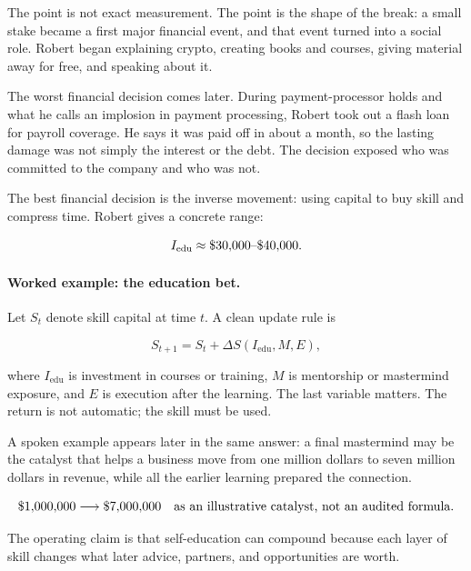 The point is not exact measurement. The point is the shape of the break: a small stake became a first major financial event, and that event turned into a social role. Robert began explaining crypto, creating books and courses, giving material away for free, and speaking about it.

The worst financial decision comes later. During payment-processor holds and what he calls an implosion in payment processing, Robert took out a flash loan for payroll coverage. He says it was paid off in about a month, so the lasting damage was not simply the interest or the debt. The decision exposed who was committed to the company and who was not.

The best financial decision is the inverse movement: using capital to buy skill and compress time. Robert gives a concrete range:

\begin{equation}
I_{\mathrm{edu}} \approx \$30{,}000\hbox{--}\$40{,}000.
\end{equation}

\paragraph{Worked example: the education bet.}
Let \(S_t\) denote skill capital at time \(t\). A clean update rule is

\begin{equation}
S_{t+1}
=
S_t
+
\Delta S(I_{\mathrm{edu}},M,E),
\end{equation}

where \(I_{\mathrm{edu}}\) is investment in courses or training, \(M\) is mentorship or mastermind exposure, and \(E\) is execution after the learning. The last variable matters. The return is not automatic; the skill must be used.

A spoken example appears later in the same answer: a final mastermind may be the catalyst that helps a business move from one million dollars to seven million dollars in revenue, while all the earlier learning prepared the connection.

\begin{equation}
\$1{,}000{,}000
\longrightarrow
\$7{,}000{,}000
\quad
\hbox{as an illustrative catalyst, not an audited formula.}
\end{equation}

The operating claim is that self-education can compound because each layer of skill changes what later advice, partners, and opportunities are worth.

